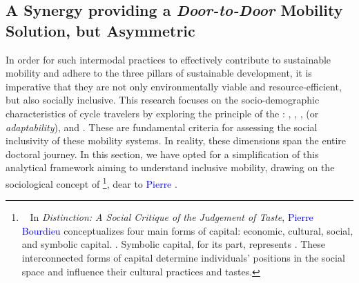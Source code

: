 \begin{refsegment}
    \newpage
\section{A Synergy providing a \textsl{Door-to-Door} Mobility Solution, but Asymmetric
    \label{section-chap4:profil-sociodemographique}
    }

In order for such intermodal practices to effectively contribute to sustainable mobility and adhere to the three pillars of \gls{sustainable} development, it is imperative that they are not only environmentally viable and resource-efficient, but also socially inclusive. This research focuses on the socio-demographic characteristics of cycle travelers by exploring the principle of the  \textcolor{blue}{\autocite[347]{shrestha_review_2017}}: , , ,  (or \textsl{adaptability}), and . These are fundamental criteria for assessing the social inclusivity of these mobility systems. In reality, these dimensions span the entire doctoral journey. In this section, we have opted for a simplification of this analytical framework aiming to understand inclusive mobility, drawing on the sociological concept of \footnote{~
    In \textsl{Distinction: A Social Critique of the Judgement of Taste}, \textcolor{blue}{Pierre Bourdieu} conceptualizes four main forms of capital: economic, cultural, social, and symbolic capital.  \textcolor{blue}{\autocite[2]{bourdieu_distinction_1979}}. Symbolic capital, for its part, represents  \textcolor{blue}{\autocite[178]{bourdieu_sens_1980}}. These interconnected forms of capital determine individuals' positions in the social space and influence their cultural practices and tastes.
}, dear to \textcolor{blue}{Pierre} \textcolor{blue}{\textcite[2]{bourdieu_distinction_1979}}.%


\end{refsegment}
